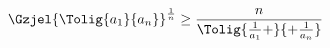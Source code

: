    $$
   \Gzjel{\Tolig{a_{1}}{a_{n}}}^{\frac{1}{n}} \ge 
   \frac{n}{\Tolig{\frac{1}{a_{1}}+}{+\frac{1}{a_{n}}}} 
   $$
